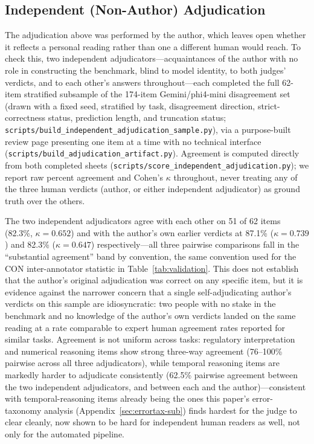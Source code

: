 \subsection{Independent (Non-Author) Adjudication}
\label{app:independent-adjudication}

The adjudication above was performed by the author, which leaves open whether it reflects a
personal reading rather than one a different human would reach. To check this, two independent
adjudicators---acquaintances of the author with no role in constructing the benchmark, blind to
model identity, to both judges' verdicts, and to each other's answers throughout---each completed
the full 62-item stratified subsample of the 174-item Gemini/phi4-mini disagreement set (drawn with
a fixed seed, stratified by task, disagreement direction, strict-correctness status, prediction
length, and truncation status; \texttt{scripts/build\_independent\_adjudication\_sample.py}), via a
purpose-built review page presenting one item at a time with no technical interface
(\texttt{scripts/build\_adjudication\_artifact.py}). Agreement is computed directly from both
completed sheets (\texttt{scripts/score\_independent\_adjudication.py}); we report raw percent
agreement and Cohen's $\kappa$ throughout, never treating any of the three human verdicts (author,
or either independent adjudicator) as ground truth over the others.

The two independent adjudicators agree with each other on 51 of 62 items (82.3\%, $\kappa=0.652$)
and with the author's own earlier verdicts at 87.1\% ($\kappa=0.739$) and 82.3\% ($\kappa=0.647$)
respectively---all three pairwise comparisons fall in the ``substantial agreement'' band by
\citet{landiskoch1977} convention, the same convention used for the CON inter-annotator statistic in
Table~\ref{tab:validation}. This does not establish that the author's original adjudication was correct on
any specific item, but it is evidence against the narrower concern that a single self-adjudicating
author's verdicts on this sample are idiosyncratic: two people with no stake in the benchmark and no
knowledge of the author's own verdicts landed on the same reading at a rate comparable to expert
human agreement rates reported for similar tasks. Agreement is not uniform across tasks: regulatory
interpretation and numerical reasoning items show strong three-way agreement (76--100\% pairwise
across all three adjudicators), while temporal reasoning items are markedly harder to adjudicate
consistently (62.5\% pairwise agreement between the two independent adjudicators, and between each
and the author)---consistent with temporal-reasoning items already being the ones this paper's
error-taxonomy analysis (Appendix~\ref{sec:errortax-sub}) finds hardest for the judge to clear
cleanly, now shown to be hard for independent human readers as well, not only for the automated
pipeline.

